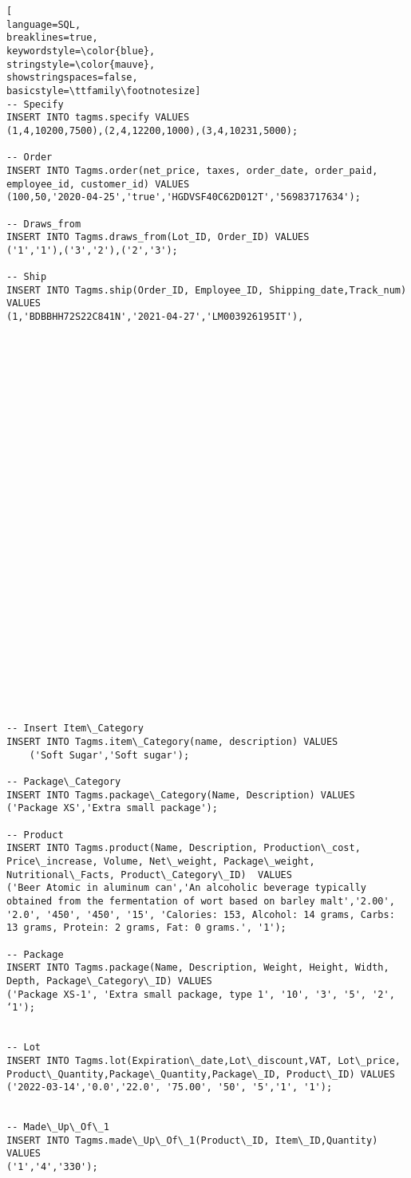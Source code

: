 \begin{lstlisting}[
language=SQL,
breaklines=true,
keywordstyle=\color{blue},
stringstyle=\color{mauve},
showstringspaces=false,
basicstyle=\ttfamily\footnotesize]
-- Specify
INSERT INTO tagms.specify VALUES
(1,4,10200,7500),(2,4,12200,1000),(3,4,10231,5000);

-- Order
INSERT INTO Tagms.order(net_price, taxes, order_date, order_paid, employee_id, customer_id) VALUES
(100,50,'2020-04-25','true','HGDVSF40C62D012T','56983717634');

-- Draws_from
INSERT INTO Tagms.draws_from(Lot_ID, Order_ID) VALUES
('1','1'),('3','2'),('2','3');

-- Ship
INSERT INTO Tagms.ship(Order_ID, Employee_ID, Shipping_date,Track_num) VALUES
(1,'BDBBHH72S22C841N','2021-04-27','LM003926195IT'),






























-- Insert Item\_Category
INSERT INTO Tagms.item\_Category(name, description) VALUES
    ('Soft Sugar','Soft sugar');
    
-- Package\_Category
INSERT INTO Tagms.package\_Category(Name, Description) VALUES 
('Package XS','Extra small package');

-- Product
INSERT INTO Tagms.product(Name, Description, Production\_cost, Price\_increase, Volume, Net\_weight, Package\_weight, Nutritional\_Facts, Product\_Category\_ID)  VALUES
('Beer Atomic in aluminum can','An alcoholic beverage typically obtained from the fermentation of wort based on barley malt','2.00', '2.0', '450', '450', '15', 'Calories: 153, Alcohol: 14 grams, Carbs: 13 grams, Protein: 2 grams, Fat: 0 grams.', '1');

-- Package
INSERT INTO Tagms.package(Name, Description, Weight, Height, Width, Depth, Package\_Category\_ID) VALUES
('Package XS-1', 'Extra small package, type 1', '10', '3', '5', '2', ‘1');


-- Lot
INSERT INTO Tagms.lot(Expiration\_date,Lot\_discount,VAT, Lot\_price, Product\_Quantity,Package\_Quantity,Package\_ID, Product\_ID) VALUES
('2022-03-14','0.0','22.0', '75.00', '50', '5','1', '1');


-- Made\_Up\_Of\_1
INSERT INTO Tagms.made\_Up\_Of\_1(Product\_ID, Item\_ID,Quantity) VALUES
('1','4','330');



\end{lstlisting}
